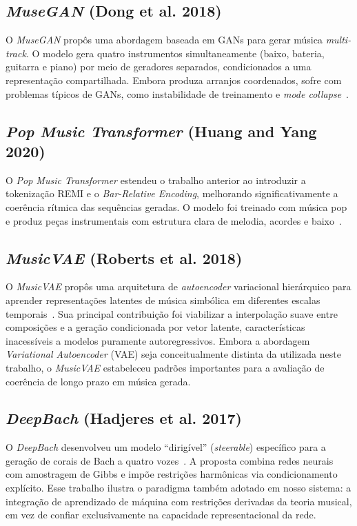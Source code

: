 \documentclass[12pt]{article}
\begin{document}
\subsection{\emph{MuseGAN} (Dong et al. 2018)}

O \emph{MuseGAN} propôs uma abordagem baseada em GANs para gerar música
\emph{multi-track}. O modelo gera quatro instrumentos simultaneamente (baixo,
bateria, guitarra e piano) por meio de geradores separados, condicionados a uma
representação compartilhada. Embora produza arranjos coordenados, sofre com
problemas típicos de GANs, como instabilidade de treinamento e \emph{mode
collapse}~\cite{dong2018}.

\subsection{\emph{Pop Music Transformer} (Huang and Yang 2020)}

O \emph{Pop Music Transformer} estendeu o trabalho anterior ao introduzir a
tokenização REMI e o \emph{Bar-Relative Encoding}, melhorando significativamente a
coerência rítmica das sequências geradas. O modelo foi treinado com música pop e
produz peças instrumentais com estrutura clara de melodia, acordes e
baixo~\cite{huang2020}.

\subsection{\emph{MusicVAE} (Roberts et al. 2018)}

O \emph{MusicVAE} propôs uma arquitetura de \emph{autoencoder} variacional hierárquico
para aprender representações latentes de música simbólica em diferentes escalas
temporais~\cite{roberts2018}. Sua principal contribuição foi viabilizar a
interpolação suave entre composições e a geração condicionada por vetor latente,
características inacessíveis a modelos puramente autoregressivos. Embora a
abordagem \emph{Variational Autoencoder} (VAE) seja conceitualmente distinta da
utilizada neste trabalho, o \emph{MusicVAE} estabeleceu padrões importantes para a
avaliação de coerência de longo prazo em música gerada.

\subsection{\emph{DeepBach} (Hadjeres et al. 2017)}

O \emph{DeepBach} desenvolveu um modelo ``dirigível'' (\emph{steerable}) específico para
a geração de corais de Bach a quatro vozes~\cite{hadjeres2017}. A proposta combina
redes neurais com amostragem de Gibbs e impõe restrições harmônicas via
condicionamento explícito. Esse trabalho ilustra o paradigma também adotado em
nosso sistema: a integração de aprendizado de máquina com restrições derivadas da
teoria musical, em vez de confiar exclusivamente na capacidade representacional da
rede.
\end{document}
